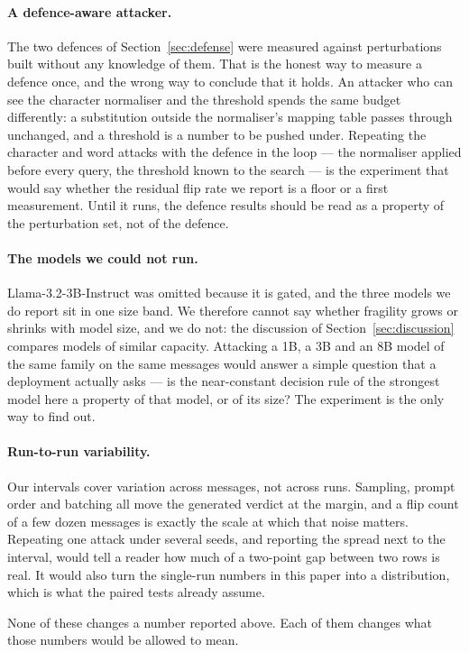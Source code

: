 \paragraph{A defence-aware attacker.} The two defences of Section~\ref{sec:defense}
were measured against perturbations built without any knowledge of them. That is
the honest way to measure a defence once, and the wrong way to conclude that it
holds. An attacker who can see the character normaliser and the threshold spends
the same budget differently: a substitution outside the normaliser's mapping
table passes through unchanged, and a threshold is a number to be pushed under.
Repeating the character and word attacks with the defence in the loop --- the
normaliser applied before every query, the threshold known to the search --- is
the experiment that would say whether the residual flip rate we report is
a floor or a first measurement. Until it runs, the defence results should be read
as a property of the perturbation set, not of the defence.

\paragraph{The models we could not run.} Llama-3.2-3B-Instruct was omitted
because it is gated, and the three models we do report sit in one size band. We
therefore cannot say whether fragility grows or shrinks with model size, and we
do not: the discussion of Section~\ref{sec:discussion} compares models of similar
capacity. Attacking a 1B, a 3B and an 8B model of the same family on the same
messages would answer a simple question that a deployment actually asks --- is the
near-constant decision rule of the strongest model here a property of that model,
or of its size? The experiment is the only way to find out.

\paragraph{Run-to-run variability.} Our intervals cover variation across
messages, not across runs. Sampling, prompt order and batching all move the
generated verdict at the margin, and a flip count of a few dozen messages is
exactly the scale at which that noise matters. Repeating one attack under several
seeds, and reporting the spread next to the interval, would tell a reader how
much of a two-point gap between two rows is real. It would also turn the
single-run numbers in this paper into a distribution, which is what the paired
tests already assume.

None of these changes a number reported above. Each of them changes what those
numbers would be allowed to mean.
